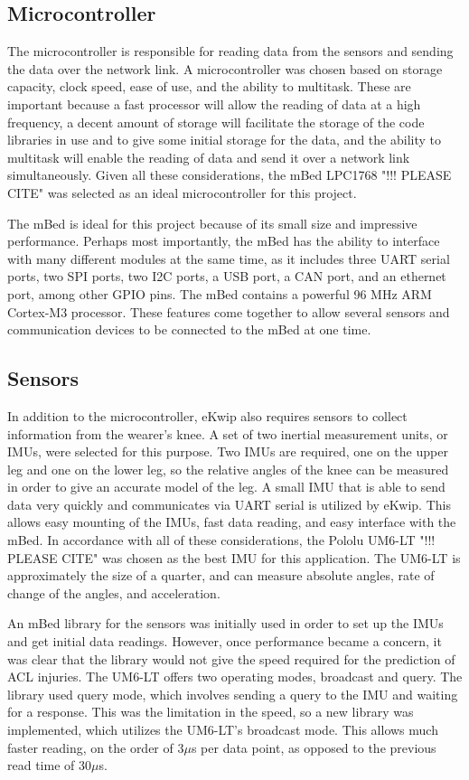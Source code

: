 \subsection {Microcontroller}
The microcontroller is responsible for reading data from the sensors and sending the data over the network link. A microcontroller was chosen based on storage capacity, clock speed, ease of use, and the ability to multitask. These are important because a fast processor will allow the reading of data at a high frequency, a decent amount of storage will facilitate the storage of the code libraries in use and to give some initial storage for the data, and the ability to multitask will enable the reading of data and send it over a network link simultaneously. Given all these considerations, the mBed LPC1768 "!!! PLEASE CITE" was selected as an ideal microcontroller for this project.

The mBed is ideal for this project because of its small size and impressive performance. Perhaps most importantly, the mBed has the ability to interface with many different modules at the same time, as it includes three UART serial ports, two SPI ports, two I2C ports, a USB port, a CAN port, and an ethernet port, among other GPIO pins. The mBed contains a powerful 96 MHz ARM Cortex-M3 processor. These features come together to allow several sensors and communication devices to be connected to the mBed at one time.

\subsection {Sensors}
In addition to the microcontroller, eKwip also requires sensors to collect information from the wearer's knee. A set of two inertial measurement units, or IMUs, were selected for this purpose. Two IMUs are required, one on the upper leg and one on the lower leg, so the relative angles of the knee can be measured in order to give an accurate model of the leg. A small IMU that is able to send data very quickly and communicates via UART serial is utilized by eKwip. This allows easy mounting of the IMUs, fast data reading, and easy interface with the mBed. In accordance with all of these considerations, the Pololu UM6-LT "!!! PLEASE CITE" was chosen as the best IMU for this application. The UM6-LT is approximately the size of a quarter, and can measure absolute angles, rate of change of the angles, and acceleration.

An mBed library for the sensors was initially used in order to set up the IMUs and get initial data readings. However, once performance became a concern, it was clear that the library would not give the speed required for the prediction of ACL injuries. The UM6-LT offers two operating modes, broadcast and query. The library used query mode, which involves sending a query to the IMU and waiting for a response. This was the limitation in the speed, so a new library was implemented, which utilizes the UM6-LT's broadcast mode. This allows much faster reading, on the order of 3$\mu$s per data point, as opposed to the previous read time of 30$\mu$s.
